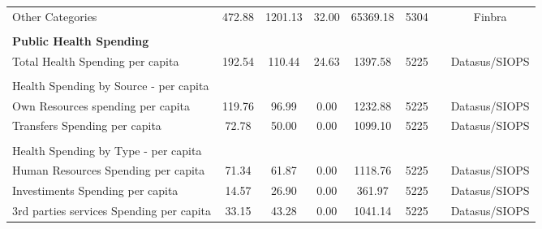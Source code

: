\begin{table}[H]
\begin{footnotesize}
\begin{center}
{\begin{threeparttable}[b]
\begin{tabular}{rrrrrrrr}
    \multicolumn{1}{l}{Other Categories} & \multicolumn{1}{c}{472.88} & \multicolumn{1}{c}{1201.13} & \multicolumn{1}{c}{32.00} & \multicolumn{1}{c}{65369.18} & \multicolumn{1}{c}{5304} &       & \multicolumn{1}{c}{Finbra} \\
          &       &       &       &       &       &       &  \\
    \multicolumn{1}{l}{\textbf{Public Health Spending}} &       &       &       &       &       &       &  \\
    \multicolumn{1}{l}{Total Health Spending per capita} & \multicolumn{1}{c}{192.54} & \multicolumn{1}{c}{110.44} & \multicolumn{1}{c}{24.63} & \multicolumn{1}{c}{1397.58} & \multicolumn{1}{c}{5225} &       & \multicolumn{1}{c}{Datasus/SIOPS} \\
          &       &       &       &       &       &       &  \\
    \multicolumn{1}{l}{Health Spending by Source - per capita} &       &       &       &       &       &       &  \\
    \multicolumn{1}{l}{Own Resources spending per capita} & \multicolumn{1}{c}{119.76} & \multicolumn{1}{c}{96.99} & \multicolumn{1}{c}{0.00} & \multicolumn{1}{c}{1232.88} & \multicolumn{1}{c}{5225} &       & \multicolumn{1}{c}{Datasus/SIOPS} \\
    \multicolumn{1}{l}{Transfers Spending per capita} & \multicolumn{1}{c}{72.78} & \multicolumn{1}{c}{50.00} & \multicolumn{1}{c}{0.00} & \multicolumn{1}{c}{1099.10} & \multicolumn{1}{c}{5225} &       & \multicolumn{1}{c}{Datasus/SIOPS} \\
          &       &       &       &       &       &       &  \\
    \multicolumn{1}{l}{Health Spending by Type - per capita} &       &       &       &       &       &       &  \\
    \multicolumn{1}{l}{Human Resources Spending per capita} & \multicolumn{1}{c}{71.34} & \multicolumn{1}{c}{61.87} & \multicolumn{1}{c}{0.00} & \multicolumn{1}{c}{1118.76} & \multicolumn{1}{c}{5225} &       & \multicolumn{1}{c}{Datasus/SIOPS} \\
    \multicolumn{1}{l}{Investiments Spending per capita} & \multicolumn{1}{c}{14.57} & \multicolumn{1}{c}{26.90} & \multicolumn{1}{c}{0.00} & \multicolumn{1}{c}{361.97} & \multicolumn{1}{c}{5225} &       & \multicolumn{1}{c}{Datasus/SIOPS} \\
    \multicolumn{1}{l}{3rd parties services Spending per capita} & \multicolumn{1}{c}{33.15} & \multicolumn{1}{c}{43.28} & \multicolumn{1}{c}{0.00} & \multicolumn{1}{c}{1041.14} & \multicolumn{1}{c}{5225} &       & \multicolumn{1}{c}{Datasus/SIOPS} \\

\end{tabular}
\end{threeparttable}}
\end{center}
\end{footnotesize}
\end{table}
